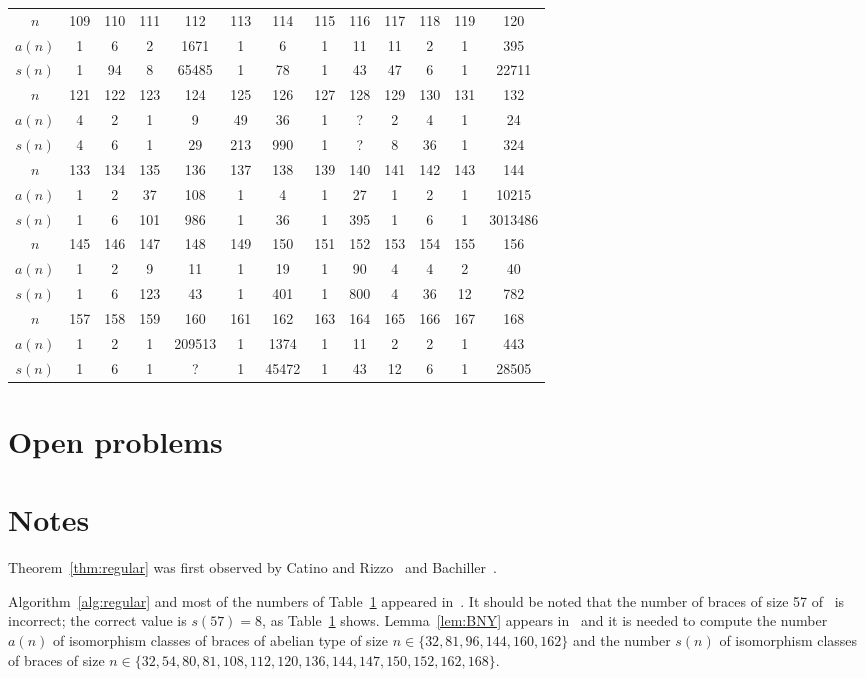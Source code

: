 \begin{table}[ht]
\begin{tabular}{|c|cccccccccccc|}
		\hline
		$n$ & 109 & 110 & 111 & 112 & 113 & 114 & 115 & 116 & 117 & 118 & 119 & 120\tabularnewline
		$a(n)$ & 1 & 6 & 2 & 1671 & 1 & 6 & 1 & 11 & 11 & 2 & 1 & 395\tabularnewline
		$s(n)$ & 1 & 94 &  8 & 65485 &  1 & 78 &  1 & 43 &  47 &  6 &  1 & 22711 \tabularnewline
		\hline

		$n$ & 121 & 122 & 123 & 124 & 125 & 126 & 127 & 128 & 129 & 130 & 131 & 132\tabularnewline
		$a(n)$ & 4 & 2 & 1 &  9  & 49 & 36 & 1 & ? & 2 &  4 & 1 & 24\tabularnewline
		$s(n)$ & 4 & 6 & 1 & 29 & 213 & 990 & 1 & ? & 8 & 36 & 1 & 324 \tabularnewline
		\hline

		$n$  & 133 & 134 & 135 & 136 & 137 & 138 & 139 & 140 & 141 & 142 & 143 & 144\tabularnewline
		$a(n)$ & 1 & 2 & 37 & 108 & 1 & 4 & 1 & 27 & 1 & 2 & 1 & 10215\tabularnewline
		$s(n)$ & 1 & 6 & 101 & 986 & 1 & 36 & 1 & 395 & 1 & 6 & 1 & 3013486 \tabularnewline
		\hline
		
		$n$ & 145 & 146 & 147 & 148 & 149 & 150 & 151 & 152 & 153 & 154 & 155 & 156\tabularnewline
		$a(n)$ & 1 & 2 & 9 & 11 & 1 & 19 & 1 & 90 & 4 & 4 & 2 & 40\tabularnewline
		$s(n)$ & 1 & 6 & 123 & 43 & 1 & 401 & 1 & 800 & 4 & 36 & 12 & 782 \tabularnewline
		\hline

		$n$ & 157 & 158 & 159 & 160 & 161 & 162 & 163 & 164 & 165 & 166 & 167 & 168\tabularnewline
		$a(n)$ & 1 & 2 & 1 & 209513 & 1 & 1374 & 1 & 11 & 2 & 2 & 1 & 443\tabularnewline
		$s(n)$ & 1 & 6 & 1 & ? & 1 & 45472 & 1 & 43 & 12 & 6 & 1 & 28505 \tabularnewline
		\hline
	\end{tabular}
	\label{tab:braces}
\end{table}

\section*{Open problems}


\section*{Notes}

Theorem~\ref{thm:regular} was first observed by Catino and Rizzo~\cite{MR2486886} and Bachiller~\cite{MR3465351}. 

Algorithm~\ref{alg:regular} and most of the numbers of Table~\ref{tab:braces} appeared in~\cite{MR3647970}. 
It should be noted that the number of braces of size 57 of~\cite{MR3647970} is incorrect;
the correct value is $s(57)=8$, as Table~\ref{tab:braces} shows. 
Lemma~\ref{lem:BNY} appears in~\cite{MR4113853} and it is needed to compute the number 
$a(n)$ of isomorphism classes of braces of abelian type of size $n\in\{32,81,96,144,160,162\}$ and 
the number 
$s(n)$ of isomorphism classes of braces of size 
$n\in\{32,54,80,81,108,112,120,136,144,147,150,152,162,168\}$. 

